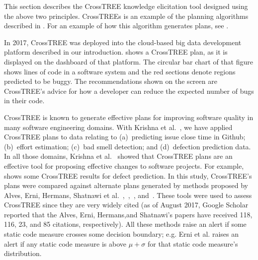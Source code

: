 This section describes the CrossTREE  knowledge elicitation tool
designed using the above two
principles.
 CrossTREEs is an example of the  planning algorithms described in . For an example of how
 this algorithm generates plans, see .
 
In 2017, CrossTREE was  deployed into the cloud-based big data development platform described in our introduction.  shows a CrossTREE plan, as it is displayed on the dashboard of
that   platform. The circular bar chart 
of that figure shows lines of code in a software system and the red sections denote regions predicted to be buggy.  The recommendations shown on the screen are CrossTREE's
advice for how a developer can reduce the expected number of bugs in their code.






 
 CrossTREE   is known to generate effective plans  for improving software quality in many   software engineering domains.
With Krishna et al.~\cite{krishna2017learning,krishna16,Kr16}, we have  applied CrossTREE
 plans  to data relating to (a)~predicting issue close time in Github;
(b)~effort estimation; (c)~bad smell detection; and  (d)~defection prediction data. 
In all those domains, Krishna et al.~\cite{krishna2017learning,krishna16,Kr16} showed
 that CrossTREE plans are an effective tool for proposing effective changes to software projects.
 For example,  shows some CrossTREE results for defect prediction.
In this study,
CrossTREE's plans were compared against alternate
plans generated by methods proposed by Alves, Erni, Hermans, Shatnawi et al.~\cite{Al10},~\cite{Er96},~\cite{He15}, and~\cite{Sh10}. These tools were used to assess CrossTREE since they are very  widely cited (as of August 2017, Google Scholar reported that the Alves, Erni, Hermans,and Shatnawi's papers have received  118, 116, 23, and  85 citations, respectively).
All these methods raise an alert if some static code measure crosses some decision boundary;
e.g. Erni et al. raises an alert if any static code measure is above  $\mu+\sigma$  for that static code measure's distribution. 



